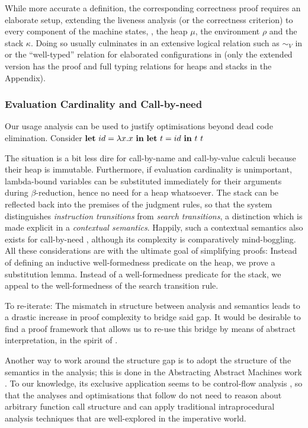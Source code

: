 While more accurate a definition, the corresponding correctness proof
requires an elaborate setup, extending the liveness analysis (or the correctness
criterion) to every component of the machine states, \eg, the heap $μ$,
the environment $ρ$ and the stack $κ$. Doing so usually culminates in
an extensive logical relation such as $\sim_V$ in \citep[Theorem
2.21]{Nielson:99} or the ``well-typed'' relation for elaborated configurations
in \citep[Lemma 4.3]{cardinality-ext} (only the extended version has the proof
and full typing relations for heaps and stacks in the Appendix).

\subsubsection{Evaluation Cardinality and Call-by-need}
Our usage analysis can be used to justify optimisations beyond dead code
elimination. Consider $\mathbf{let}~{id}={\lambda x. x}~\mathbf{in}~{\mathbf{let}~{t}={id}~\mathbf{in}~{t~t}}$



The situation is a bit less dire for call-by-name and call-by-value calculi
because their heap is immutable. Furthermore, if evaluation cardinality is
unimportant, lambda-bound variables can be substituted immediately for their
arguments during $β$-reduction, hence no need for a heap whatsoever. The
stack can be reflected back into the premises of the judgment rules, so that
the system distinguishes \emph{instruction transitions} from \emph{search
transitions}, a distinction which is made explicit in a \emph{contextual
semantics}. Happily, such a contextual semantics also exists for call-by-need
\citep{Ariola:95}, although its complexity is comparatively mind-boggling.
All these considerations are with the ultimate goal of simplifying proofs:
Instead of defining an inductive well-formedness predicate on the heap, we prove
a substitution lemma. Instead of a well-formedness predicate for the stack, we
appeal to the well-formedness of the search transition rule.

To re-iterate: The mismatch in structure between analysis and semantics leads to
a drastic increase in proof complexity to bridge said gap. It would be desirable
to find a proof framework that allows us to re-use this bridge by means of
abstract interpretation, in the spirit of \citet{Cousot:21}.

Another way to work around the structure gap is to adopt the structure of the
semantics in the analysis; this is done in the Abstracting Abstract
Machines work \citep{aam}. To our knowledge, its exclusive application seems
to be control-flow analysis \citep{Shivers:91}, so that the analyses and
optimisations that follow do not need to reason about arbitrary function call
structure and can apply traditional intraprocedural analysis techniques that are
well-explored in the imperative world. 

